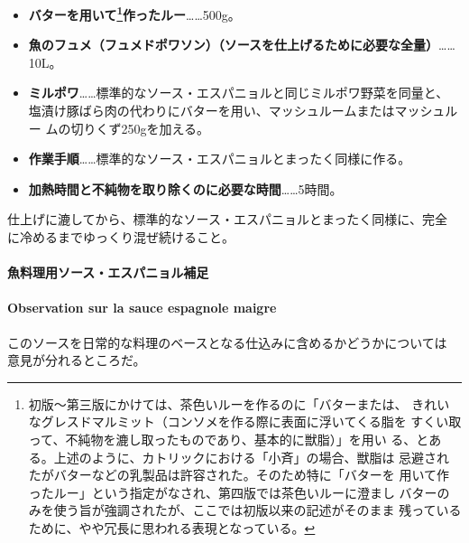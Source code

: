 \documentclass[twoside,12Q,b5j]{escoffierltjsbook}
\begin{document}
\begin{itemize}
\item
  \textbf{バターを用いて\footnote{初版〜第三版にかけては、茶色いルーを作るのに「バターまたは、
    きれいなグレスドマルミット（コンソメを作る際に表面に浮いてくる脂を
    すくい取って、不純物を漉し取ったものであり、基本的に獣脂）」を用い
    る、とある。上述のように、カトリックにおける「小斉」の場合、獣脂は
    忌避されたがバターなどの乳製品は許容された。そのため特に「バターを
    用いて作ったルー」という指定がなされ、第四版では茶色いルーに澄まし
    バターのみを使う旨が強調されたが、ここでは初版以来の記述がそのまま
    残っているために、やや冗長に思われる表現となっている。}作ったルー}\ldots{}\ldots{}500g。
\item
  \textbf{魚のフュメ（フュメドポワソン）（ソースを仕上げるために必要な全量）}\ldots{}\ldots{}10L。
\item
  \textbf{ミルポワ}\ldots{}\ldots{}標準的なソース・エスパニョルと同じミルポワ野菜を同量と、
  塩漬け豚ばら肉の代わりにバターを用い、マッシュルームまたはマッシュルー
  ムの切りくず250gを加える。
\item
  \textbf{作業手順}\ldots{}\ldots{}標準的なソース・エスパニョルとまったく同様に作る。
\item
  \textbf{加熱時間と不純物を取り除くのに必要な時間}\ldots{}\ldots{}5時間。
\end{itemize}

仕上げに漉してから、標準的なソース・エスパニョルとまったく同様に、完全
に冷めるまでゆっくり混ぜ続けること。

\vspace*{1.7\zw}

\paragraph{魚料理用ソース・エスパニョル補足}\label{ux9b5aux6599ux7406ux7528ux30bdux30fcux30b9ux30a8ux30b9ux30d1ux30cbux30e7ux30ebux88dcux8db3}

\paragraph{Observation sur la sauce espagnole
maigre}\label{observation-sur-la-sauce-espagnole-maigre}


このソースを日常的な料理のベースとなる仕込みに含めるかどうかについては
意見が分れるところだ。
\end{document}
